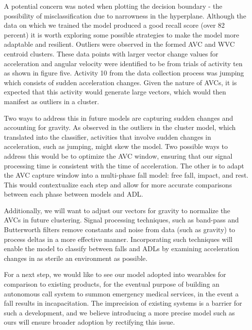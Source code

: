 \documentclass{llncs}
\begin{document}
	A potential concern was noted when plotting the decision boundary - the possibility of misclassification due to narrowness in the hyperplane. Although the data on which we trained the model produced a good recall score (over 82 percent) it is worth exploring some possible strategies to make the model more adaptable and resilient. Outliers were observed in the formed AVC and WVC centroid clusters. These data points with larger vector change values for acceleration and angular velocity were identified to be from trials of activity ten as shown in figure five. Activity 10 from the data collection process was jumping which consists of sudden acceleration changes. Given the nature of AVCs, it is expected that this activity would generate large vectors, which would then manifest as outliers in a cluster.
	
	Two ways to address this in future models are capturing sudden changes and accounting for gravity. As observed in the outliers in the cluster model, which translated into the classifier, activities that involve sudden changes in acceleration, such as jumping, might skew the model. Two possible ways to address this would be to optimize the AVC window, ensuring that our signal processing time is consistent with the time of acceleration. The other is to adapt the AVC capture window into a multi-phase fall model: free fall, impact, and rest. This would contextualize each step and allow for more accurate comparisons between each phase between models and ADL.
	
	Additionally, we will want to adjust our vectors for gravity to normalize the AVCs in future clustering. Signal processing techniques, such as band-pass and Butterworth filters remove constants and noise from data (such as gravity) to process deltas in a more effective manner. Incorporating such techniques will enable the model to classify between falls and ADLs by examining acceleration changes in as sterile an environment as possible.

	For a next step, we would like to see our model adopted into wearables for comparison to existing products, for the eventual purpose of building an autonomous call system to summon emergency medical services, in the event a fall results in incapacitation. The imprecision of existing systems is a barrier for such a development, and we believe introducing a more precise model such as ours will ensure broader adoption by rectifying this issue.

\end{document}
